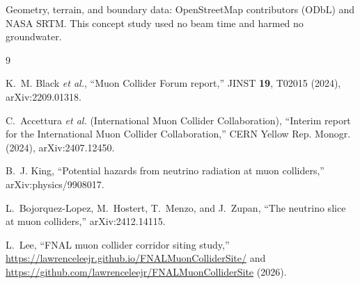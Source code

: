 \documentclass[aps,prl,reprint,superscriptaddress,nofootinbib]{revtex4-2}
\begin{document}
\begin{acknowledgments}
Geometry, terrain, and boundary data: OpenStreetMap contributors (ODbL)
and NASA SRTM. This concept study used no beam time and harmed no
groundwater.
\end{acknowledgments}

\begin{thebibliography}{9}

K.~M. Black \emph{et al.}, ``Muon Collider Forum report,''
JINST \textbf{19}, T02015 (2024), arXiv:2209.01318.

C.~Accettura \emph{et al.} (International Muon Collider Collaboration),
``Interim report for the International Muon Collider Collaboration,''
CERN Yellow Rep. Monogr. (2024), arXiv:2407.12450.

B.~J. King, ``Potential hazards from neutrino radiation at muon
colliders,'' arXiv:physics/9908017.

L.~Bojorquez-Lopez, M.~Hostert, T.~Menzo, and J.~Zupan,
``The neutrino slice at muon colliders,'' arXiv:2412.14115.

L.~Lee, ``FNAL muon collider corridor siting study,''
\url{https://lawrenceleejr.github.io/FNALMuonColliderSite/} and
\url{https://github.com/lawrenceleejr/FNALMuonColliderSite} (2026).

\end{thebibliography}
\end{document}

